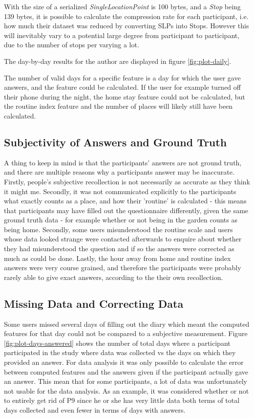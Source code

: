 With the size of a serialized \textit{SingleLocationPoint} is 100 bytes, and a \textit{Stop} being 139 bytes, it is possible to calculate the compression rate for each participant, i.e. how much their dataset was reduced by converting SLPs into Stops. However this will inevitably vary to a potential large degree from participant to participant, due to the number of stops per  varying a lot.


The day-by-day results for the author are displayed in figure \ref{fig:plot-daily}.

The number of valid days for a specific feature is a day for which the user gave answers, and the feature could be calculated. If the user for example turned off their phone during the night, the home stay feature could not be calculated, but the routine index feature and the number of places will likely still have been calculated.


\subsection{Subjectivity of Answers and Ground Truth}
A thing to keep in mind is that the participants' answers are not ground truth, and there are multiple reasons why a participants answer may be inaccurate. Firstly, people's subjective recollection is not necessarily as accurate as they think it might me. Secondly, it was not communicated explicitly to the participants what exactly counts as a place, and how their 'routine' is calculated - this means that participants may have filled out the questionnaire differently, given the same ground truth data - for example whether or not being in the garden counts as being home. Secondly, some users misunderstood the routine scale and users whose data looked strange were contacted afterwards to enquire about whether they had misunderstood the question and if so the answers were corrected as much as could be done. Lastly, the hour away from home and routine index answers were very course grained, and therefore the participants were probably rarely able to give exact answers, according to the their own recollection. 

\subsection{Missing Data and Correcting Data}
Some users missed several days of filling out the diary which meant the computed features for that day could not be compared to a subjective measurement. Figure \ref{fig:plot-days-answered} shows the number of total days where a participant participated in the study where data was collected vs the days on which they provided an answer. For data analysis it was only possible to calculate the error between computed features and the answers given if the participant actually gave an answer. This mean that for some participants, a lot of data was unfortunately not usable for the data analysis. As an example, it was considered whether or not to entirely get rid of P9 since he or she has very little data both terms of total days collected and even fewer in terms of days with answers. 

